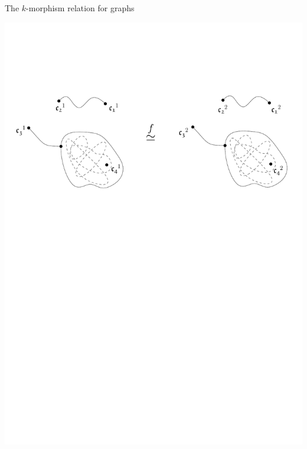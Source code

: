 \documentclass[11pt]{beamer}
\begin{document}
	\begin{frame}{The $k$-morphism relation for graphs}
	\begin{center}
		\includegraphics[width=\linewidth]{kmorphiccenter1.pdf}
	\end{center}
	\end{frame}
	
\end{document}
